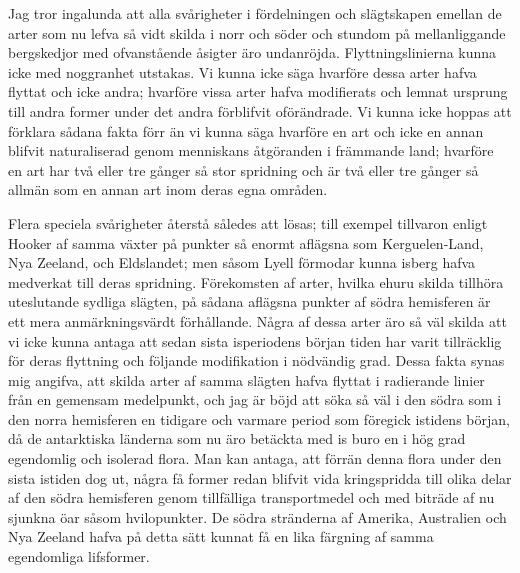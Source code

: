 Jag tror ingalunda att alla svårigheter i fördelningen och slägtskapen emellan de arter som nu lefva så vidt skilda i norr och söder och stundom på mellanliggande bergskedjor med ofvanstående åsigter äro undanröjda. Flyttningslinierna kunna icke med noggranhet utstakas. Vi kunna icke säga hvarföre dessa arter hafva flyttat och icke andra; hvarföre vissa arter hafva modifierats och lemnat ursprung till andra former under det andra förblifvit oförändrade. Vi kunna icke hoppas att förklara sådana fakta förr än vi kunna säga hvarföre en art och icke en annan blifvit naturaliserad genom menniskans åtgöranden i främmande land; hvarföre en art har två eller tre gånger så stor spridning och är två eller tre gånger så allmän som en annan art inom deras egna områden.

Flera speciela svårigheter återstå således att lösas; till exempel tillvaron enligt Hooker af samma växter på punkter så enormt aflägsna som Kerguelen-Land, Nya Zeeland, och Eldslandet; men såsom Lyell förmodar kunna isberg hafva medverkat till deras spridning. Förekomsten af arter, hvilka ehuru skilda tillhöra uteslutande sydliga slägten, på sådana aflägsna punkter af södra hemisferen är ett mera anmärkningsvärdt förhållande. Några af dessa arter äro så väl skilda att vi icke kunna antaga att sedan sista isperiodens början tiden har varit tillräcklig för deras flyttning och följande modifikation i nödvändig grad. Dessa fakta synas mig angifva, att skilda arter af samma slägten hafva flyttat i radierande linier från en gemensam medelpunkt, och jag är böjd att söka så väl i den södra som i den norra hemisferen en tidigare och varmare period som föregick istidens början, då de antarktiska länderna som nu äro betäckta med is buro en i hög grad egendomlig och isolerad flora. Man kan antaga, att förrän denna flora under den sista istiden dog ut, några få former redan blifvit vida kringspridda till olika delar af den södra hemisferen genom tillfälliga transportmedel och med biträde af nu sjunkna öar såsom hvilopunkter. De södra stränderna af Amerika, Australien och Nya Zeeland hafva på detta sätt kunnat få en lika färgning af samma egendomliga lifsformer.

